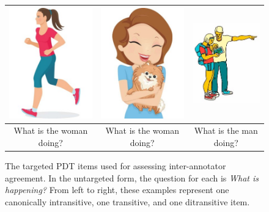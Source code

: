 \begin{figure}[htb!]
\begin{center}
\begin{tabular}{|c|c|c|}
\hline
{\includegraphics[width=0.29\columnwidth]{figures/I30.jpg}} & {\includegraphics[width=0.3\columnwidth]{figures/I29.jpg}} & {\includegraphics[width=0.3\columnwidth]{figures/I28.jpg}} \\
\hline
What is the woman doing? & What is the woman doing? & What is the man doing? \\
\hline
\end{tabular}
\caption{\label{fig:test-sample-items} The targeted PDT items used for assessing inter-annotator agreement. In the untargeted form, the question for each is \textit{What is happening?} From left to right, these examples represent one canonically intransitive, one transitive, and one ditransitive item.}
\end{center}
\end{figure}

